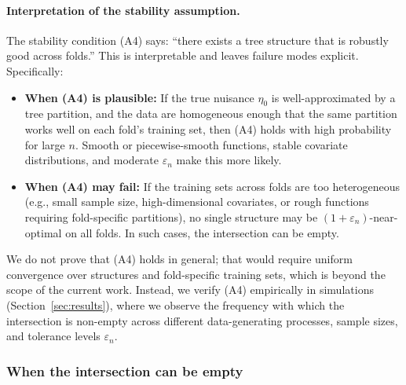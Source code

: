 \documentclass[12pt]{article}
\begin{document}
\paragraph{Interpretation of the stability assumption.}
The stability condition (A4) says: ``there exists a tree structure that is robustly good across folds.'' This is interpretable and leaves failure modes explicit. Specifically:
\begin{itemize}
\item \textbf{When (A4) is plausible:} If the true nuisance $\eta_0$ is well-approximated by a tree partition, and the data are homogeneous enough that the same partition works well on each fold's training set, then (A4) holds with high probability for large $n$. Smooth or piecewise-smooth functions, stable covariate distributions, and moderate $\varepsilon_n$ make this more likely.
\item \textbf{When (A4) may fail:} If the training sets across folds are too heterogeneous (e.g., small sample size, high-dimensional covariates, or rough functions requiring fold-specific partitions), no single structure may be $(1+\varepsilon_n)$-near-optimal on all folds. In such cases, the intersection can be empty.
\end{itemize}

We do not prove that (A4) holds in general; that would require uniform convergence over structures and fold-specific training sets, which is beyond the scope of the current work. Instead, we verify (A4) empirically in simulations (Section~\ref{sec:results}), where we observe the frequency with which the intersection is non-empty across different data-generating processes, sample sizes, and tolerance levels $\varepsilon_n$.

\subsubsection{When the intersection can be empty}
\end{document}
